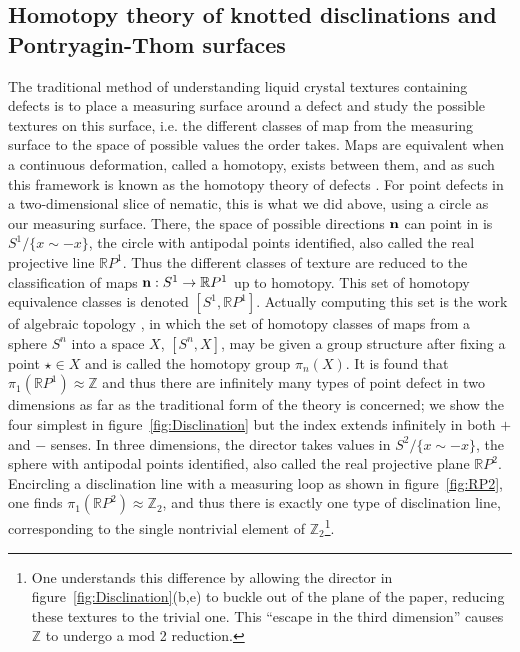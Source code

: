 \subsection{Homotopy theory of knotted disclinations and Pontryagin-Thom surfaces}
The traditional method of understanding liquid crystal textures containing defects is to place a measuring surface around a defect and study the possible textures on this surface, i.e. the different classes of map from the measuring surface to the space of possible values the order takes. Maps are equivalent when a continuous deformation, called a homotopy, exists between them, and as such this framework is known as the homotopy theory of defects \citep{Mermin1979,Alexander2012}. For point defects in a two-dimensional slice of nematic, this is what we did above, using a circle as our measuring surface. There, the space of possible directions $\bf n$ can point in is $S^1/\{x\sim-x\}$, the circle with antipodal points identified, also called the real projective line $\mathbb{R}P^1$. Thus the different classes of texture are reduced to the classification of maps ${\bf n}:S^1 \rightarrow \mathbb{R}P^1$ up to homotopy. This set of homotopy equivalence classes is denoted $[S^1,\mathbb{R}P^1]$. Actually computing this set is the work of algebraic topology \citep{Hatcher2012}, in which the set of homotopy classes of maps from a sphere $S^n$ into a space $X$, $[S^n,X]$, may be given a group structure after fixing a point $\star \in X$ and is called the homotopy group $\pi_n(X)$. It is found that $\pi_1(\mathbb{R}P^1) \approx \mathbb{Z}$ and thus there are infinitely many types of point defect in two dimensions as far as the traditional form of the theory is concerned; we show the four simplest in figure~\ref{fig:Disclination} but the index extends infinitely in both $+$ and $-$ senses. In three dimensions, the director takes values in $S^2/\{x\sim-x\}$, the sphere with antipodal points identified, also called the real projective plane $\mathbb{R}P^2$. Encircling a disclination line with a measuring loop as shown in figure~\ref{fig:RP2}, one finds $\pi_1(\mathbb{R}P^2) \approx \mathbb{Z}_2$, and thus there is exactly one type of disclination line, corresponding to the single nontrivial element of $\mathbb{Z}_2$\footnote{ One understands this difference by allowing the director in figure~\ref{fig:Disclination}(b,e) to buckle out of the plane of the paper, reducing these textures to the trivial one. This ``escape in the third dimension'' causes $\mathbb{Z}$ to undergo a mod 2 reduction.}.
